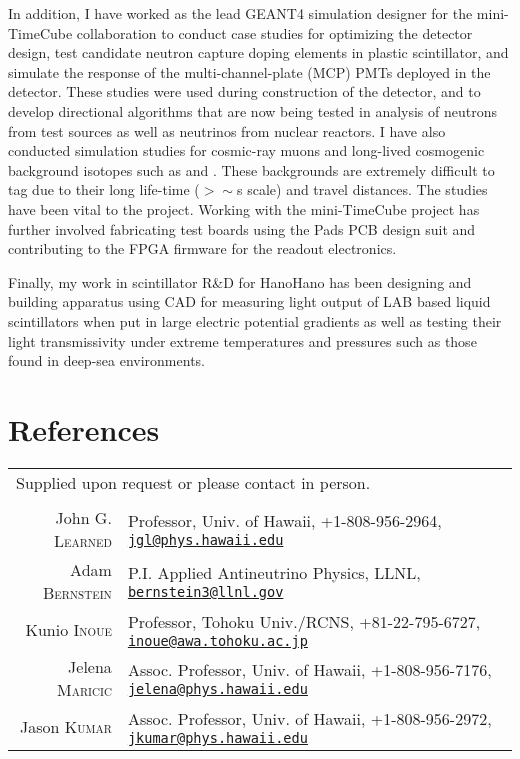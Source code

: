 \documentclass[a4paper,10pt]{article} %
\begin{document}
In addition, I have worked as the lead GEANT4 simulation designer for the
mini-TimeCube collaboration to conduct case studies for optimizing the detector
design, test candidate neutron capture doping elements in plastic
scintillator, and simulate the response of the multi-channel-plate (MCP) PMTs
deployed in the detector.
These studies were used during construction of the detector, and to develop
directional algorithms that are now being tested in analysis of neutrons from
test sources as well as neutrinos from nuclear reactors.
I have also conducted simulation studies for cosmic-ray muons and long-lived
cosmogenic background isotopes such as  and .
These backgrounds are extremely difficult to tag due to their long life-time
($>\sim$\si{\second} scale) and travel distances.
The studies have been vital to the project.
Working with the mini-TimeCube project has further involved fabricating test
boards using the Pads PCB design suit and contributing to the FPGA firmware for
the readout electronics.

Finally, my work in scintillator R\&D for HanoHano has been designing and
building apparatus using CAD for measuring light output of LAB based liquid
scintillators when put in large electric potential gradients as well as
testing their light transmissivity under extreme temperatures and
pressures such as those found in deep-sea environments.


\section{References}

\begin{tabular}{rp{12cm}}
\multicolumn{2}{l}{\footnotesize{Supplied upon request or please contact in
person.}}\\
\multicolumn{2}{c}{}\\
John G. \textsc{Learned} & Professor, Univ. of Hawaii, +1-808-956-2964,
\href{mailto:jgl@phys.hawaii.edu}{\nolinkurl{jgl@phys.hawaii.edu}}\\

Adam \textsc{Bernstein} & P.I. Applied Antineutrino Physics, LLNL,
\href{mailto:bernstein3@llnl.gov}{\nolinkurl{bernstein3@llnl.gov}}\\

Kunio \textsc{Inoue} & Professor, Tohoku Univ./RCNS, +81-22-795-6727,
\href{mailto:inoue@awa.tohoku.ac.jp}{\nolinkurl{inoue@awa.tohoku.ac.jp}}\\

Jelena \textsc{Maricic} & Assoc. Professor, Univ. of Hawaii, +1-808-956-7176,
\href{mailto:jelena@phys.hawaii.edu}{\nolinkurl{jelena@phys.hawaii.edu}}\\

Jason \textsc{Kumar} & Assoc. Professor, Univ. of Hawaii, +1-808-956-2972,
\href{mailto:jkumar@phys.hawaii.edu}{\nolinkurl{jkumar@phys.hawaii.edu}}\\
\end{tabular}

\end{document}
